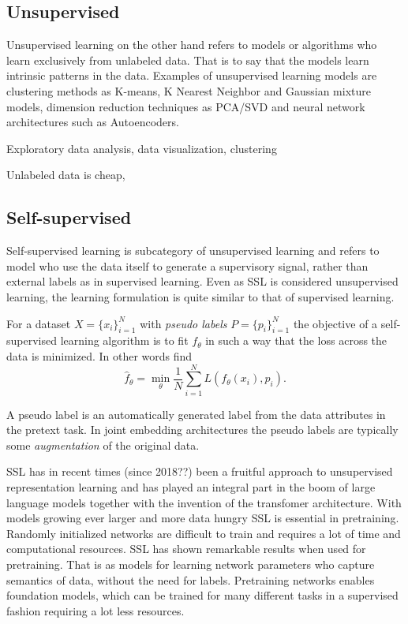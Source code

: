 \documentclass[../../thesis.tex]{subfiles}
\begin{document}
\subsection{Unsupervised}
Unsupervised learning on the other hand refers to models or algorithms who learn exclusively from unlabeled data. That is to say that the models learn intrinsic patterns in the data. Examples of unsupervised learning models are clustering methods as K-means, K Nearest Neighbor and Gaussian mixture models, dimension reduction techniques as PCA/SVD and neural network architectures such as Autoencoders. 


Exploratory data analysis, data visualization, clustering

Unlabeled data is cheap, 

\subsection{Self-supervised}
Self-supervised learning is subcategory of unsupervised learning and refers to model who use the data itself to generate a supervisory signal, rather than external labels as in supervised learning. Even as SSL is considered unsupervised learning, the learning formulation is quite similar to that of supervised learning.\newline

For a dataset $X = \{x_i\}_{i=1}^N$ with \textit{pseudo labels} $P = \{p_i\}_{i=1}^N$ the objective of a self-supervised learning algorithm is to fit $f_\theta$ in such a way that the loss across the data is minimized. In other words find 
\begin{equation}
    \widehat{f}_\theta = \min_\theta \frac{1}{N} \sum_{i=1}^N L(f_\theta(x_i),p_i).
\end{equation}

A pseudo label is an automatically generated label from the data attributes in the pretext task. In joint embedding architectures the pseudo labels are typically some \textit{augmentation} of the original data.\newline

SSL has in recent times (since 2018??) been a fruitful approach to unsupervised representation learning and has played an integral part in the boom of large language models together with the invention of the transfomer architecture. With models growing ever larger and more data hungry SSL is essential in pretraining. Randomly initialized networks are difficult to train and requires a lot of time and computational resources. SSL has shown remarkable results when used for pretraining. That is as models for learning network parameters who capture semantics of data, without the need for labels. Pretraining networks enables foundation models, which can be trained for many different tasks in a supervised fashion requiring a lot less resources.\newline
\end{document}
